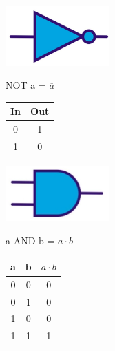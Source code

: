 \newpage
\begin{minipage}{.4\textwidth}
	\centering
	\includegraphics[width=4cm]{figures/ch13/symbol_not.jpg}
	\label{fig:not_gate2}
\end{minipage}%
\begin{minipage}{.2\textwidth}
	NOT a = $\overline{a}$
\end{minipage}%
\begin{minipage}{.4\textwidth}
		\begin{tabular}{|c|c|}
			\hline
			In  & Out \\
			\hline\hline
			0 & 1 \\
			\hline
			1 & 0 \\
			\hline
		\end{tabular}
\end{minipage}

\begin{minipage}{.4\textwidth}
	\centering
	\includegraphics[width=4cm]{figures/ch13/symbol_and.jpg}
	\label{fig:symbol_and}
\end{minipage}%
\begin{minipage}{.2\textwidth}
	a AND b = $a\cdot b$
\end{minipage}%
\begin{minipage}{.4\textwidth}
	\begin{tabular}{|c|c|c|}
		\hline
		a & b  & $a\cdot b$ \\
		\hline\hline
		0 & 0 & 0 \\
		\hline
		0 & 1 & 0 \\
		\hline
		1 & 0 & 0 \\
		\hline
		1 & 1 & 1 \\
		\hline
	\end{tabular}
\end{minipage}

